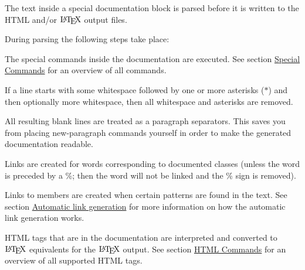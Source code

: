 The text inside a special documentation block is parsed before it is written to the HTML and/or $\mbox{\LaTeX}$ output files.

 During parsing the following steps take place: 
\begin{DoxyItemize}
\item The special commands inside the documentation are executed. See section \hyperlink{commands}{Special Commands} for an overview of all commands. 
\item If a line starts with some whitespace followed by one or more asterisks ({\ttfamily $\ast$}) and then optionally more whitespace, then all whitespace and asterisks are removed. 
\item All resulting blank lines are treated as a paragraph separators. This saves you from placing new-\/paragraph commands yourself in order to make the generated documentation readable. 
\item Links are created for words corresponding to documented classes (unless the word is preceded by a \%; then the word will not be linked and the \% sign is removed). 
\item Links to members are created when certain patterns are found in the text. See section \hyperlink{autolink}{Automatic link generation} for more information on how the automatic link generation works. 
\item HTML tags that are in the documentation are interpreted and converted to $\mbox{\LaTeX}$ equivalents for the $\mbox{\LaTeX}$ output. See section \hyperlink{htmlcmds}{HTML Commands} for an overview of all supported HTML tags. 
\end{DoxyItemize}

 